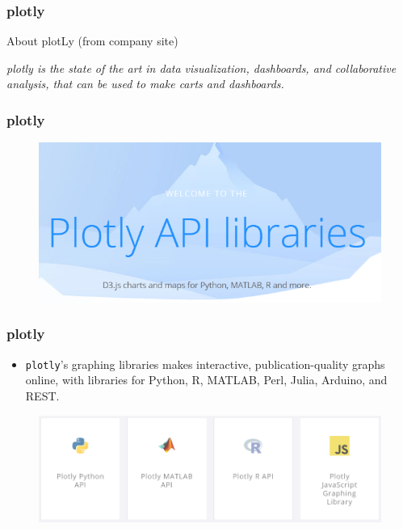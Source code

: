 \documentclass{beamer}
\begin{document}
\begin{frame}
\frametitle{plotly}
\Large	
About plotLy (from company site)

\begin{framed}

\textit{plotly is the state of the art in data visualization, dashboards, and collaborative analysis, that can be used to make carts and dashboards.}
\end{framed}
\end{frame}
\begin{frame}
\frametitle{plotly}
\Large
\begin{figure}
\centering
\includegraphics[width=1.05\linewidth]{plotlyapis1}
\end{figure}

\end{frame}
\begin{frame}
\frametitle{plotly}
\Large	
\begin{itemize}
	\item \texttt{plotly}'s graphing libraries makes interactive, publication-quality graphs online, with libraries for Python, R, MATLAB, Perl, Julia, Arduino, and REST.
\end{itemize}
\begin{figure}
\centering
\includegraphics[width=1.05\linewidth]{plotlyapis}

\end{figure}

\end{frame}
\end{document}
